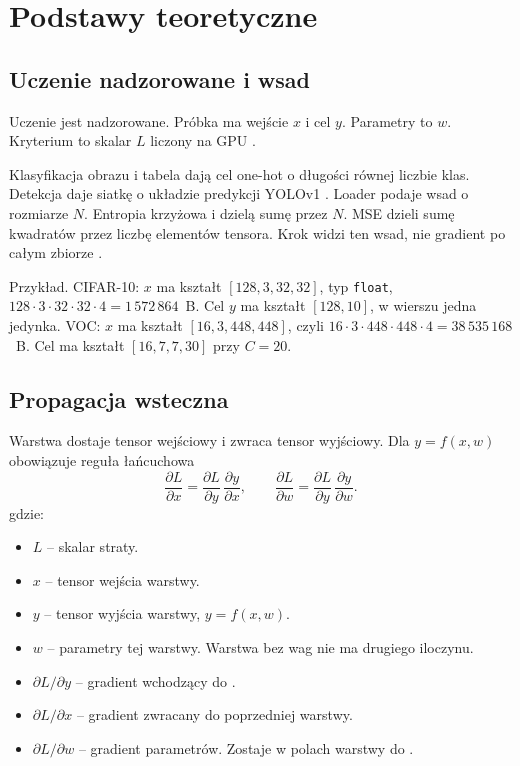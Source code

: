 \chapter{Podstawy teoretyczne}

\section{Uczenie nadzorowane i wsad}

Uczenie jest nadzorowane. Próbka ma wejście \(x\) i cel \(y\). Parametry to \(w\). Kryterium to skalar \(L\) liczony na GPU \cite{goodfellow2016deep}.

Klasyfikacja obrazu i tabela dają cel one-hot o długości równej liczbie klas. Detekcja daje siatkę o układzie predykcji YOLOv1 \cite{redmon2016yolo}. Loader podaje wsad o rozmiarze \(N\). Entropia krzyżowa i  dzielą sumę przez \(N\). MSE dzieli sumę kwadratów przez liczbę elementów tensora. Krok widzi ten wsad, nie gradient po całym zbiorze \cite{goodfellow2016deep}.

Przykład. CIFAR-10: \(x\) ma kształt \([128, 3, 32, 32]\), typ \texttt{float}, \(128 \cdot 3 \cdot 32 \cdot 32 \cdot 4 = 1\,572\,864\)~B. Cel \(y\) ma kształt \([128, 10]\), w wierszu jedna jedynka. VOC: \(x\) ma kształt \([16, 3, 448, 448]\), czyli \(16 \cdot 3 \cdot 448 \cdot 448 \cdot 4 = 38\,535\,168\)~B. Cel ma kształt \([16, 7, 7, 30]\) przy \(C = 20\).

\section{Propagacja wsteczna}

Warstwa dostaje tensor wejściowy i zwraca tensor wyjściowy. Dla \(y = f(x, w)\) obowiązuje reguła łańcuchowa \cite{goodfellow2016deep}
\begin{equation}
\label{eq:lancuch}
\frac{\partial L}{\partial x}
  = \frac{\partial L}{\partial y}\,\frac{\partial y}{\partial x},
\qquad
\frac{\partial L}{\partial w}
  = \frac{\partial L}{\partial y}\,\frac{\partial y}{\partial w}.
\end{equation}
gdzie:
\begin{itemize}
\item \(L\) -- skalar straty.
\item \(x\) -- tensor wejścia warstwy.
\item \(y\) -- tensor wyjścia warstwy, \(y = f(x, w)\).
\item \(w\) -- parametry tej warstwy. Warstwa bez wag nie ma drugiego iloczynu.
\item \(\partial L / \partial y\) -- gradient wchodzący do .
\item \(\partial L / \partial x\) -- gradient zwracany do poprzedniej warstwy.
\item \(\partial L / \partial w\) -- gradient parametrów. Zostaje w polach warstwy do .
\end{itemize}


